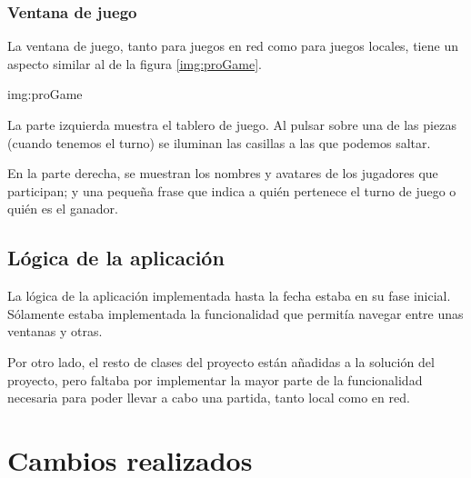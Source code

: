 
\subsubsection{Ventana de juego}
La ventana de juego, tanto para juegos en red como para juegos locales, tiene
un aspecto similar al de la figura \ref{img:proGame}.

{img:proGame}

La parte izquierda muestra el tablero de juego. Al pulsar sobre una de las piezas 
(cuando tenemos el turno) se iluminan las casillas a las que podemos saltar.

En la parte derecha, se muestran los nombres y avatares de los jugadores que 
participan; y una pequeña frase que indica a quién pertenece el turno de juego o 
quién es el ganador.

\subsection{Lógica de la aplicación}
La lógica de la aplicación implementada hasta la fecha estaba en su fase
inicial. Sólamente estaba implementada la funcionalidad que permitía
navegar entre unas ventanas y otras.

Por otro lado, el resto de clases del proyecto están añadidas a la solución
del proyecto, pero faltaba por implementar la mayor parte de la funcionalidad 
necesaria para poder llevar a cabo una partida, tanto local como en red.

\section{Cambios realizados}

